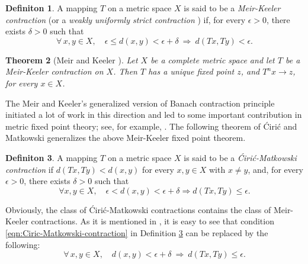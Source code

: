 \documentclass[a4paper,10pt,twoside,reqno]{amsart}
\newtheorem{thm}{Theorem}[section]
\theoremstyle{definition}
\newtheorem{dfn}[thm]{Definiton}
\theoremstyle{remark}
\newcommand{\de}{\delta}
\newcommand{\e}{\epsilon}
\numberwithin{equation}{section}
\begin{document}
\begin{dfn}\label{dfn:Meir-Keeler-contraction}
  A mapping $T$ on a metric space $X$ is said to be a \emph{Meir-Keeler contraction}
  (or a \emph{weakly uniformly strict contraction} \cite{Meir-Keeler-1969})
  if, for every $\e>0$, there exists $\de>0$ such that
  \begin{equation*}%
    \forall\, x,y\in X,\quad
    \e \leq d(x,y) < \e+\de\ \Longrightarrow\
    d(Tx,Ty)<\e.
  \end{equation*}
\end{dfn}

\begin{thm}[Meir and Keeler \cite{Meir-Keeler-1969}]
\label{thm:Meir-Keeler}
  Let $X$ be a complete metric space and let $T$ be a Meir-Keeler contraction
  on $X$. Then $T$ has a unique fixed point $z$, and $T^nx\to z$, for every $x\in X$.
\end{thm}

The Meir and Keeler's generalized version of Banach contraction principle
initiated a lot of work in this direction and led to some important contribution
in metric fixed point theory; see, for example,
\cite{Maiti-Pal-1978,
Park-Rhoades-1981,
Rao-Rao-1985,
Jachymski-1995,
Cho-Murthy-Jungck-2000}.
The following theorem of \'Ciri\'c \cite{Ciric-1981} and Matkowski \cite[Theorem 1.5.1]{Kuczma}
generalizes the above Meir-Keeler fixed point theorem.

\begin{dfn}
\label{dfn:Ciric-Matkowski contraction}
  A mapping $T$ on a metric space $X$ is said to be
  a \emph{\'Ciri\'c-Matkowski contraction} if $d(Tx,Ty)<d(x,y)$ for
  every $x,y\in X$ with $x\neq y$, and, for every $\e>0$, there exists $\de>0$ such that
  \begin{equation}\label{eqn:Ciric-Matkowski-contraction}
    \forall x,y\in X, \quad
    \e< d(x,y) < \e+\de \Longrightarrow d(Tx,Ty) \leq \e.
  \end{equation}
\end{dfn}

Obviously, the class of \'Ciri\'c-Matkowski contractions contains the class
of Meir-Keeler contractions. As it is mentioned in \cite[Proposition 1]{Jachymski-1995},
it is easy to see that condition \eqref{eqn:Ciric-Matkowski-contraction} in Definition \ref{dfn:Ciric-Matkowski contraction} can be replaced by the following:
\begin{equation*}%
  \forall\, x,y\in X,\quad
  d(x,y) < \e+\de\ \Longrightarrow\
  d(Tx,Ty)\leq \e.
\end{equation*}
\end{document}
